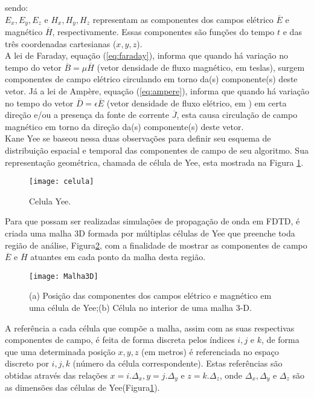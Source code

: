 		sendo:\\
		$E_x, E_y, E_z$ e $H_x, H_y, H_z$ representam as componentes dos campos elétrico $\overline{E}$ e magnético $\overline{H}$, respectivamente. Essas componentes são funções do tempo $t$ e das três coordenadas cartesianas ($x,y,z$).\\
		
			A lei de Faraday, equação (\ref{eq:faraday}), informa que quando há variação no tempo do vetor $\overline{B}=\mu\overline{H}$ (vetor densidade de fluxo magnético, em teslas), surgem componentes de campo elétrico circulando em torno da(s) componente(s) deste vetor. Já a lei de Ampère, equação (\ref{eq:ampere}), informa que quando há variação no tempo do vetor $\overline{D}=\epsilon\overline{E}$ (vetor densidade de fluxo elétrico, em ) em certa direção e/ou a presença da fonte de corrente $\overline{J}$, esta causa circulação de campo magnético em torno da direção da(s) componente(s) deste vetor.\\
			
			Kane Yee se baseou nessa duas observações para definir seu esquema  de distribuição espacial  e temporal das componentes  de campo  de seu algoritmo. Sua representação geométrica, chamada de célula de Yee, esta mostrada na Figura \ref{fg:celulaYee}\cite{rodrigo}.\\
			
			 \begin{figure}[ht!]
			  \centering
			  \texttt{[image: celula]}
			  \caption{Celula Yee.}
			  \label{fg:celulaYee}
			\end{figure} 
		
		Para que possam ser realizadas simulações de propagação de onda em FDTD, é criada uma malha 3D formada por múltiplas células de Yee que preenche toda região de análise, Figura\ref{fg:grade}\cite{almeida}, com a finalidade de mostrar as componentes de campo $\overline{E}$ e $\overline{H}$ atuantes em cada ponto da malha desta região.	\\
			\begin{figure}[ht!]
			  \centering
			  \texttt{[image: Malha3D]}
			  \caption{(a) Posição das componentes dos campos elétrico e magnético em uma célula de Yee;(b) Célula no interior de uma malha 3-D.}
			  \label{fg:grade}
			\end{figure} 
			
			A referência a cada célula que compõe a malha, assim com as suas respectivas componentes de campo, é feita de forma discreta pelos índices $i, j$ e $k$, de forma que uma determinada posição $x, y, z$ (em metros) é referenciada no espaço discreto por $i, j, k$ (número da célula correspondente). Estas  referências são obtidas através das relações $x = i.\Delta_x, y = j.\Delta_{y}$ e $z = k.\Delta_z$, onde  $\Delta_x,  \Delta_y$ e $\Delta_z$ são as dimensões das células de Yee(Figura\ref{fg:celulaYee}).
